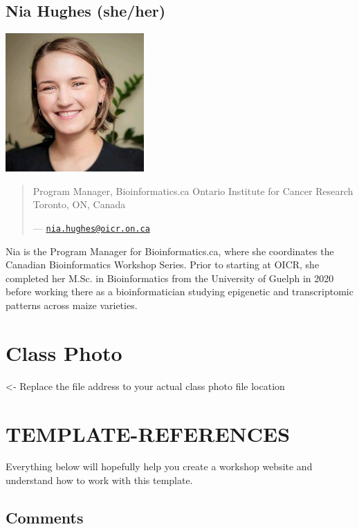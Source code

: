 \documentclass[
]{book}
\begin{document}
\subsection{Nia Hughes (she/her)}\label{nia-hughes-sheher}

\includegraphics{./img/faculty/nia-hughes.jpeg}\\

\begin{quote}
Program Manager, Bioinformatics.ca
Ontario Institute for Cancer Research
Toronto, ON, Canada

--- \href{mailto:nia.hughes@oicr.on.ca}{\nolinkurl{nia.hughes@oicr.on.ca}}
\end{quote}

Nia is the Program Manager for Bioinformatics.ca, where she coordinates the Canadian
Bioinformatics Workshop Series. Prior to starting at OICR, she completed her M.Sc. in
Bioinformatics from the University of Guelph in 2020 before working there as a
bioinformatician studying epigenetic and transcriptomic patterns across maize varieties.

\section{Class Photo}\label{class-photo}

\textless- Replace the file address to your actual class photo file location

\section{TEMPLATE-REFERENCES}\label{template-references}

Everything below will hopefully help you create a workshop website and understand how to work with this template.

\subsection{Comments}\label{comments}
\end{document}
